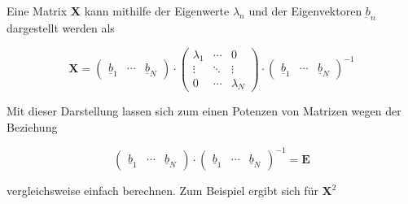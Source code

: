 \noindent Eine Matrix \textbf{X} kann mithilfe der Eigenwerte $\lambda_{n}$ und der Eigenvektoren $\underbar{b}_{n}$ dargestellt werden als 

\begin{equation}\label{eq:thirteenonehundredtwentyseven}
\mathbf{X}=\left(\begin{array}{ccc} {\underline{b}_{1} } & {\cdots } & {\underline{b}_{N} } \end{array}\right)\cdot \left(\begin{array}{ccc} {\lambda _{1} } & {\cdots } & {0} \\ {\vdots } & {\ddots } & {\vdots } \\ {0} & {\cdots } & {\lambda _{N} } \end{array}\right)\cdot \left(\begin{array}{ccc} {\underline{b}_{1} } & {\cdots } & {\underline{b}_{N} } \end{array}\right)^{-1}
\end{equation}

\noindent Mit dieser Darstellung lassen sich zum einen Potenzen von Matrizen wegen der Beziehung 

\begin{equation}\label{eq:thirteenonehundredtwentyeight}
\left(\begin{array}{ccc} {\underline{b}_{1} } & {\cdots } & {\underline{b}_{N} } \end{array}\right)\cdot \left(\begin{array}{ccc} {\underline{b}_{1} } & {\cdots } & {\underline{b}_{N} } \end{array}\right)^{-1} =\mathbf{E}
\end{equation}

\noindent vergleichsweise einfach berechnen. Zum Beispiel ergibt sich f\"{u}r $\textbf{X}^{2}$ 

